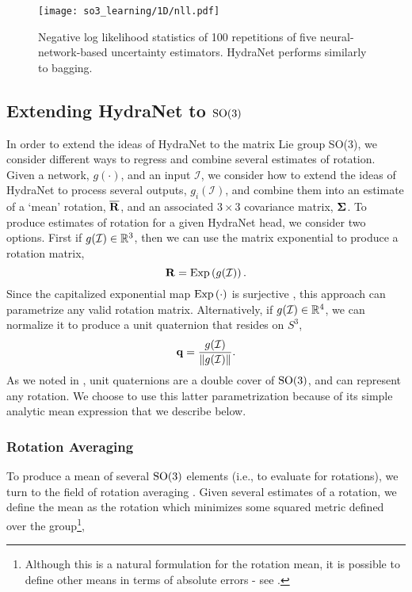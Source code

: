 \begin{figure}
	\centering
	\texttt{[image: so3\_learning/1D/nll.pdf]}
	\vspace{-1em}
	\caption{Negative log likelihood statistics of 100 repetitions of five neural-network-based uncertainty estimators. HydraNet performs similarly to bagging. }
	\label{fig:noise-free-boxplot}
\end{figure}

\subsection{Extending HydraNet to $\mathrm{SO}(3)$}

In order to extend the ideas of HydraNet to the matrix Lie group SO(3), we
consider different ways to regress and combine several estimates of rotation.
Given a network, $g(\cdot)$, and an input $\mathcal{I}$, we consider how to extend the ideas of HydraNet to process several outputs, $g_i(\mathcal{I})$, and combine them into an estimate of a `mean' rotation, $\overline{\boldsymbol{\mathbf{R}}}$, and an associated $3\times3$ covariance matrix, $\boldsymbol{\mathbf{\Sigma}}$.  To produce estimates of rotation for a given HydraNet head, we consider two options. First if $g(\mathcal{I}) \in \mathbb{R}^3$, then we can use the matrix exponential to produce a rotation matrix,
\begin{equation}
	\boldsymbol{\mathbf{R}} = \mathrm{Exp}\left({g(\mathcal{I})}\right).
\end{equation}
Since the capitalized exponential map $\mathrm{Exp}\left({\cdot}\right)$ is surjective \citep{Barfoot2017-ri,Sola2018-kg}, this approach can parametrize any valid rotation matrix. Alternatively, if $g(\mathcal{I}) \in \mathbb{R}^4$, we can normalize it to produce a unit quaternion that resides on $S^3$,
\begin{equation}
\label{eq:quat_output}
	\boldsymbol{\mathbf{q}} = \frac{g(\mathcal{I})}{\left\Vert g(\mathcal{I})\right\Vert}.
\end{equation}
As we noted in , unit quaternions are a double cover of $\mathrm{SO}(3)$, and can represent any rotation. We choose to use this latter parametrization because of its simple analytic mean expression that we describe below.

\subsubsection{Rotation Averaging}

To produce a mean of several $\mathrm{SO}(3)$ elements (i.e., to evaluate  for rotations), we turn to the field of rotation averaging \citep{Hartley2013-rc}. Given several estimates of a rotation, we define the mean as the rotation which minimizes some squared metric defined over the group\footnote{Although this is a natural formulation for the rotation mean, it is possible to define other means in terms of absolute errors - see \citep{Hartley2013-rc}.},

